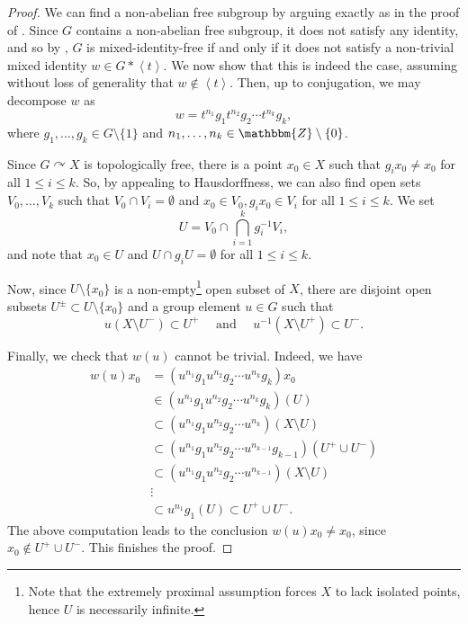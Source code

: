 \documentclass[11pt]{article}
\theoremstyle{definition}
\theoremstyle{remark}
\numberwithin{equation}{section}
\numberwithin{equation}{section}
\numberwithin{equation}{section}
\begin{document}
\begin{proof}
We can find a non-abelian free subgroup by arguing exactly as in the proof of \cite[Theorem 3.4]{Gl74}. Since $G$ contains a non-abelian free subgroup, it does not satisfy any identity, and so by \cite[Remark 5.1]{HuOs16}, $G$ is mixed-identity-free if and only if it does not satisfy a non-trivial mixed identity $ w \in G * \left\langle {t} \right\rangle $. We now show that this is indeed the case, assuming without loss of generality that $ w \notin \left\langle {t} \right\rangle $. Then, up to conjugation, we may decompose $w$ as
   $$
      w = t^{n_1}g_1 t^{n_2}g_2 \cdots t^{n_k}g_{k},
   $$
   where $ g_1, \dots, g_{k} \in G \setminus \{1\} $ and $ n_1, \dots, n_k \in \mathbbm{Z} \setminus \{0\} $.

   Since $G\curvearrowright X$ is topologically free, there is a point $x_0\in X$ such that $g_ix_0\not= x_0$ for all $1\leq i\leq k$. So, by appealing to Hausdorffness, we can also find open sets $V_0,\ldots,V_k$ such that $V_0\cap V_i=\emptyset$ and $x_0 \in V_0, g_ix_0 \in V_i$ for all $1\leq i\leq k$. We set
   \[
      U = V_0 \cap \bigcap_{i=1}^k g_i^{-1}V_i,
   \]
   and note that $x_0\in U$ and $U \cap g_iU = \emptyset$ for all $1\leq i\leq k$.
   
  Now, since  $U \setminus \{x_0\}$ is a non-empty\footnote{Note that the extremely proximal assumption forces $X$ to lack isolated points, hence $U$ is necessarily infinite.} open subset of $X$, there are disjoint open subsets $ U^{\pm} \subset U \setminus \{x_0\} $ and a group element $u\in G$ such that
    \[
      u(X \setminus U^-) \subset U^+\quad\text{ and } \quad u^{-1}(X \setminus U^+) \subset U^-.
   \]
   
   Finally, we check that $ w(u) $ cannot be trivial. Indeed, we have
   \begin{align*}
      w(u)x_0  &= (u^{n_1}g_1 u^{n_2}g_2 \cdots u^{n_k}g_{k})x_0 \\
      &\in (u^{n_1}g_1 u^{n_2}g_2 \cdots u^{n_k}g_{k})(U) \\
      &\subset (u^{n_1}g_1 u^{n_2}g_2 \cdots u^{n_k}) (X \setminus U) \\
		&\subset (u^{n_1}g_1 u^{n_2}g_2 \cdots u^{n_{k-1}}g_{k-1}) (U^+ \cup U^-) \\
        &\subset (u^{n_1}g_1 u^{n_2}g_2 \cdots u^{n_{k-1}}) (X\setminus U) \\
        &\vdots \\
		&\subset u^{n_1}g_1 (U) \subset U^+ \cup U^-.
   \end{align*}
   The above computation leads to the conclusion $w(u)x_0\not=x_0$, since $x_0 \notin U^+ \cup U^-$. This finishes the proof.
\end{proof}
\end{document}
